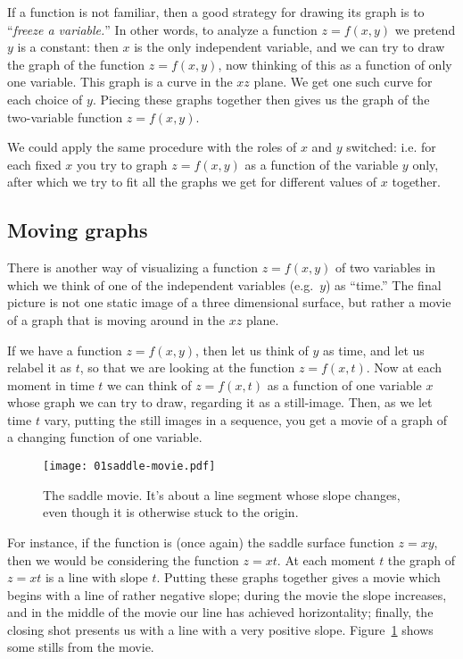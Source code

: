 If a function is not familiar, then a good strategy for drawing its graph is to
``\emph{freeze a variable.}'' In other words, to analyze a function $ z=f(x,y) $ we
pretend $y$ is a constant: then $x$ is the only independent variable, and we can try
to draw the graph of the function $z=f(x,y)$, now thinking of this as a function of
only one variable. This graph is a curve in the $xz$ plane. We get one such curve for
each choice of $y$. Piecing these graphs together then gives us the graph of the
two-variable function $z=f(x,y)$.

We could apply the same procedure with the roles of $x$ and $y$ switched: i.e.  for
each fixed $x$ you try to graph $z=f(x,y)$ as a function of the variable $y$ only,
after which we try to fit all the graphs we get for different values of $x$ together.



\subsection{Moving graphs} 
There is another way of visualizing a function $z=f(x, y)$ of two variables in which we
think of one of the independent variables (e.g.~$y$) as ``time.''  The final picture
is not one static image of a three dimensional surface, but rather a movie of a
graph that is moving around in the $xz$ plane.

If we have a function $z=f(x, y)$, then let us think of $y$ as time, and let us
relabel it as $t$, so that we are looking at the function $z=f(x,t)$. Now at each
moment in time $t$ we can think of $z=f(x,t)$ as a function of one variable $x$ whose
graph we can try to draw, regarding it as a still-image.  Then, as we let time $t$
vary, putting the still images in a sequence, you get a movie of a graph of a
changing function of one variable.

\begin{figure}[b]
  \texttt{[image: 01saddle-movie.pdf]}
  \caption{The saddle movie. It's about a line segment whose slope changes, even
  though it is otherwise stuck to the origin.}
  \label{fig:saddle-movie}
\end{figure}

For instance, if the function is (once again) the saddle surface function $z=xy$,
then we would be considering the function $z=xt$.  At each moment $t$ the graph of
$z=xt$ is a line with slope $t$. Putting these graphs together gives a movie which
begins with a line of rather negative slope;  during the movie the slope increases,
and in the middle of the movie our line has achieved horizontality; finally, the
closing shot presents us with a line with a very positive slope.
Figure~\ref{fig:saddle-movie} shows some stills from the movie.

